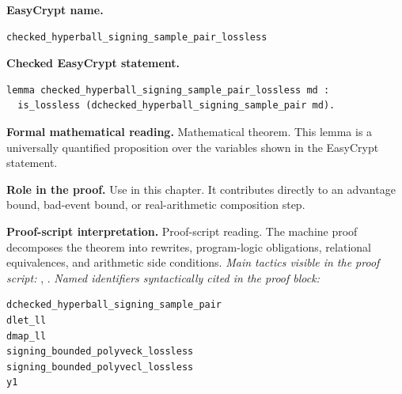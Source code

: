 \begin{formaltheorem}
\noindent\textbf{EasyCrypt name.}
\begin{lstlisting}[language=EasyCrypt,basicstyle=\ttfamily\scriptsize]
checked_hyperball_signing_sample_pair_lossless
\end{lstlisting}
\noindent\textbf{Checked EasyCrypt statement.}
\begin{lstlisting}[language=EasyCrypt,basicstyle=\ttfamily\scriptsize]
lemma checked_hyperball_signing_sample_pair_lossless md :
  is_lossless (dchecked_hyperball_signing_sample_pair md).
\end{lstlisting}
\noindent\textbf{Formal mathematical reading.}
Mathematical theorem. This lemma is a universally quantified proposition over the variables shown in the EasyCrypt statement.

\noindent\textbf{Role in the proof.}
Use in this chapter. It contributes directly to an advantage bound, bad-event bound, or real-arithmetic composition step.

\noindent\textbf{Proof-script interpretation.}
Proof-script reading. The machine proof decomposes the theorem into rewrites, program-logic obligations, relational equivalences, and arithmetic side conditions.
\emph{Main tactics visible in the proof script:} , .
\emph{Named identifiers syntactically cited in the proof block:}
\begin{lstlisting}[language=EasyCrypt,basicstyle=\ttfamily\scriptsize]
dchecked_hyperball_signing_sample_pair
dlet_ll
dmap_ll
signing_bounded_polyveck_lossless
signing_bounded_polyvecl_lossless
y1
\end{lstlisting}

\end{formaltheorem}

